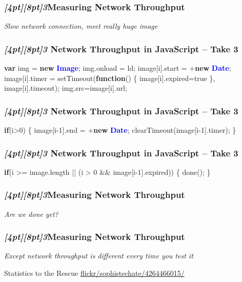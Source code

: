 \documentclass{beamer}
\newcommand{\sn}[1]{\textrm{\textit{\Huge{\raisebox{-3pt}[4pt][8pt]{\textcolor{f2elblue}{#1}}}}}\hspace{4pt}}
\newcommand{\innersplash}[1]{
  \begin{center}
    \large \textrm{\textit{ #1 } }
  \end{center}
}
\newcommand{\splashslide}[2][{}]{
  \begin{frame}
  \frametitle{#1}
  \innersplash{#2}
  \end{frame}
}
\def\green<#1>#2{\textcolor<#1>{dark-green}{\textbf<#1>{#2}}}
\def\blue<#1>#2{\textcolor<#1>{blue}{\textbf<#1>{#2}}}
\begin{document}
\splashslide[\sn{3}Measuring Network Throughput]{Slow network connection, meet really huge image}

\begin{frame}[fragile]
\frametitle{\sn{3} Network Throughput in JavaScript -- Take 3}
\begin{semiverbatim}
   \green<1>{var} img = \green<1>{new} \blue<1>{Image};
   img.onload = ld;
   image[i].start = +\green<1>{new} \blue<1>{Date};
   image[i].timer =
         setTimeout(\green<1>{function}() \{
                       image[i].expired=true
                    \},
                    image[i].timeout);
   img.src=image[i].url;
\end{semiverbatim}
\end{frame}

\begin{frame}[fragile]
\frametitle{\sn{3} Network Throughput in JavaScript -- Take 3}
\begin{semiverbatim}
\green<1>{if}(i>0) \{
   image[i-1].end = +\green<1>{new} \blue<1>{Date};
   clearTimeout(image[i-1].timer);
\}
\end{semiverbatim}
\end{frame}

\begin{frame}[fragile]
\frametitle{\sn{3} Network Throughput in JavaScript -- Take 3}
\begin{semiverbatim}
\green<1>{if}(i >= image.length
      || (i > 0 \&\& image[i-1].expired)) \{
   done();
\}
\end{semiverbatim}
\end{frame}

\splashslide[\sn{3}Measuring Network Throughput]{Are we done yet?\\ \only<2->{sure...}}

\splashslide[\sn{3}Measuring Network Throughput]{Except network throughput is different every time you test it}

\begin{frame}{Statistics to the Rescue}
\vspace{7.8cm}
\hspace{-1cm} \tiny \href{http://www.flickr.com/photos/sophistechate/4264466015/}{flickr/sophistechate/4264466015/}
\end{frame}
\end{document}
